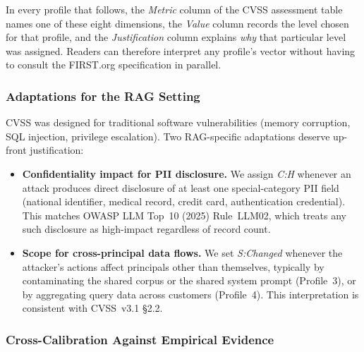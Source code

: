 \documentclass[12pt,a4paper]{report}
\begin{document}
In every profile that follows, the \emph{Metric} column of the CVSS
assessment table names one of these eight dimensions, the \emph{Value}
column records the level chosen for that profile, and the
\emph{Justification} column explains \emph{why} that particular level
was assigned. Readers can therefore interpret any profile's vector
without having to consult the FIRST.org specification in parallel.

\subsubsection{Adaptations for the RAG Setting}

CVSS was designed for traditional software vulnerabilities (memory
corruption, SQL injection, privilege escalation). Two RAG-specific
adaptations deserve up-front justification:

\begin{itemize}[leftmargin=1.4em, itemsep=3pt]
  \item \textbf{Confidentiality impact for PII disclosure.} We assign
        \emph{C:H} whenever an attack produces direct disclosure of at
        least one special-category PII field (national identifier, medical record, credit
        card, authentication credential). This matches OWASP LLM Top~10
        (2025) Rule~LLM02, which treats any such disclosure as
        high-impact regardless of record count.
  \item \textbf{Scope for cross-principal data flows.} We set
        \emph{S:Changed} whenever the attacker's actions affect
        principals other than themselves, typically by contaminating the
        shared corpus or the shared system prompt (Profile~3), or by
        aggregating query data across customers (Profile~4). This
        interpretation is consistent with CVSS~v3.1 \S2.2.
\end{itemize}

\subsubsection{Cross-Calibration Against Empirical Evidence}
\end{document}
